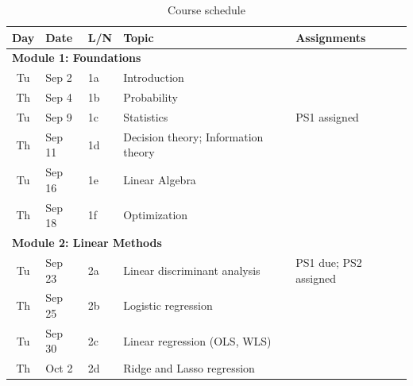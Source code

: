\documentclass[11pt,twoside]{article}
\numberwithin{equation}{section}
\newcommand{\?}{\stackrel{?}{=}}
\begin{document}



\begin{table}[h!]\small
\centering
\caption{Course schedule}
\label{tab:compsyl}
\begin{tabular}{cllll}
\toprule
\bf Day & \bf  Date & \bf L/N & \bf Topic                                             &\bf Assignments    \\%
\midrule
\multicolumn{4}{l}{\bf Module 1: Foundations}                                                     \\
\midrule  
Tu       & Sep 2     & 1a      & Introduction                                        &                   \\ 
Th       & Sep 4     & 1b      & Probability                                           &                                \\ 
Tu       & Sep 9     & 1c      & Statistics                                            &    PS1 assigned                            \\
Th       & Sep 11    & 1d      & Decision theory; Information theory                   &                                \\
Tu       & Sep 16    & 1e      & Linear Algebra                                        &                                \\
Th       & Sep 18    & 1f      & Optimization                                          &          \\
\midrule
\multicolumn{4}{l}{\bf Module 2: Linear Methods}                                \\
\midrule
Tu       & Sep 23    & 2a      & Linear discriminant analysis                          & PS1 due; PS2 assigned          \\
Th       & Sep 25    & 2b      & Logistic regression                                   &                                \\
Tu       & Sep 30    & 2c      & Linear regression (OLS, WLS)                          &                                \\ 
Th       & Oct 2     & 2d      & Ridge and Lasso regression                            &                                \\ 

\end{tabular}
\end{table}
\end{document}
